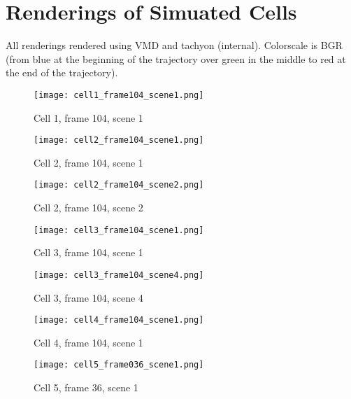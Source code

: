 
\chapter{Renderings of Simuated Cells} %
\label{cha:renderings_of_simuated_cells}

\newcommand{\cellrenderingwidth}{8cm}
\newcommand{\cellrenderingheight}{8cm}

All renderings rendered using VMD\cite{humphrey_vmd_1996} and tachyon\cite{stone_em_1998} (internal). Colorscale is BGR (from blue at the beginning of the trajectory over green in the middle to red at the end of the trajectory).

\begin{figure}[H]
\centering
  \texttt{[image: cell1\_frame104\_scene1.png]}
  \caption{Cell 1, frame 104, scene 1}
  \label{img:cell1_frame104_scene1}
\end{figure}

\begin{figure}[H]
\centering
  \texttt{[image: cell2\_frame104\_scene1.png]}
  \caption{Cell 2, frame 104, scene 1}
  \label{img:cell2_frame104_scene1}
\end{figure}

\begin{figure}[H]
\centering
  \texttt{[image: cell2\_frame104\_scene2.png]}
  \caption{Cell 2, frame 104, scene 2}
  \label{img:cell2_frame104_scene2}
\end{figure}

\begin{figure}[H]
\centering
  \texttt{[image: cell3\_frame104\_scene1.png]}
  \caption{Cell 3, frame 104, scene 1}
  \label{img:cell3_frame104_scene1}
\end{figure}

\begin{figure}[H]
\centering
  \texttt{[image: cell3\_frame104\_scene4.png]}
  \caption{Cell 3, frame 104, scene 4}
  \label{img:cell3_frame104_scene4}
\end{figure}

\begin{figure}[H]
\centering
  \texttt{[image: cell4\_frame104\_scene1.png]}
  \caption{Cell 4, frame 104, scene 1}
  \label{img:cell4_frame104_scene1}
\end{figure}

\begin{figure}[H]
\centering
  \texttt{[image: cell5\_frame036\_scene1.png]}
  \caption{Cell 5, frame 36, scene 1}
  \label{img:cell5_frame036_scene1}
\end{figure}

